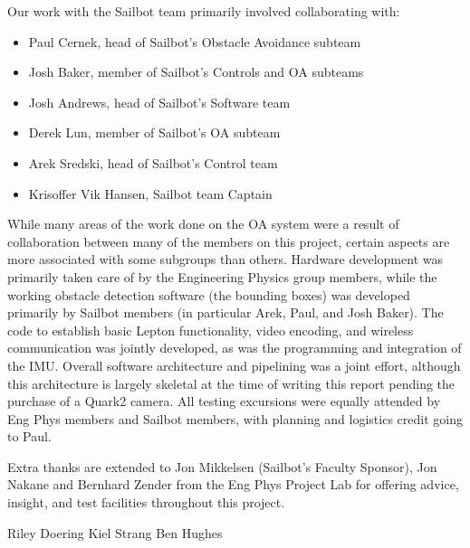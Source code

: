 Our work with the Sailbot team primarily involved collaborating with:

\begin{itemize}
 \item Paul Cernek, head of Sailbot's Obstacle Avoidance subteam
 \item Josh Baker, member of Sailbot's Controls and OA subteams
 \item Josh Andrews, head of Sailbot's Software team
 \item Derek Lun, member of Sailbot's OA subteam
 \item Arek Sredski, head of Sailbot's Control team
 \item Krisoffer Vik Hansen, Sailbot team Captain
\end{itemize}

While many areas of the work done on the OA system were a result of collaboration between many of the members on this project, certain aspects are more associated with some subgroups than others. Hardware development was primarily taken care of by the Engineering Physics group members, while the working obstacle detection software (the bounding boxes) was developed primarily by Sailbot members (in particular Arek, Paul, and Josh Baker). The code to establish basic Lepton functionality, video encoding, and wireless communication was jointly developed, as was the programming and integration of the IMU. Overall software architecture and pipelining was a joint effort, although this architecture is largely skeletal at the time of writing this report pending the purchase of a Quark2 camera. All testing excursions were equally attended by Eng Phys members and Sailbot members, with planning and logistics credit going to Paul.

Extra thanks are extended to Jon Mikkelsen (Sailbot's Faculty Sponsor), Jon Nakane and Bernhard Zender from the Eng Phys Project Lab for offering advice, insight, and test facilities throughout this project.

\vspace{20mm}
Riley Doering \hspace{40mm}  Kiel Strang \hspace{40mm} Ben Hughes